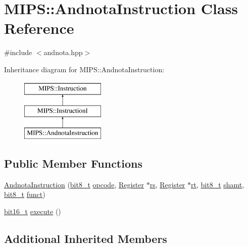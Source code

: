 \hypertarget{classMIPS_1_1AndnotaInstruction}{}\section{M\+I\+PS\+:\+:Andnota\+Instruction Class Reference}
\label{classMIPS_1_1AndnotaInstruction}


{\ttfamily \#include $<$andnota.\+hpp$>$}

Inheritance diagram for M\+I\+PS\+:\+:Andnota\+Instruction\+:\begin{figure}[H]
\begin{center}
\leavevmode
\includegraphics[height=3.000000cm]{classMIPS_1_1AndnotaInstruction}
\end{center}
\end{figure}
\subsection*{Public Member Functions}
\begin{DoxyCompactItemize}
\item 
\hyperlink{classMIPS_1_1AndnotaInstruction_aaa02f585a018e3194fc4b3fc0b2f4b04}{Andnota\+Instruction} (\hyperlink{core_8hpp_a6074bae122ae7b527864eec42c728c3c}{bit8\+\_\+t} \hyperlink{classMIPS_1_1Instruction_a45cc6808b5dde8a5d41067d148b55476}{opcode}, \hyperlink{classMIPS_1_1Register}{Register} $\ast$\hyperlink{classMIPS_1_1InstructionI_a2be191d5b3dce505e2e626ec02eb4d62}{rs}, \hyperlink{classMIPS_1_1Register}{Register} $\ast$\hyperlink{classMIPS_1_1InstructionI_add1db07a5c954f35271de8c8a5737487}{rt}, \hyperlink{core_8hpp_a6074bae122ae7b527864eec42c728c3c}{bit8\+\_\+t} \hyperlink{classMIPS_1_1InstructionI_aa9b6da37c374c2ec8d96448d341e5e7d}{shamt}, \hyperlink{core_8hpp_a6074bae122ae7b527864eec42c728c3c}{bit8\+\_\+t} \hyperlink{classMIPS_1_1InstructionI_a5c6efcbbd233a7447c1fe24ea0a1e558}{funct})
\item 
\hyperlink{core_8hpp_adc265a970bc35995b5879784bbb3f1b7}{bit16\+\_\+t} \hyperlink{classMIPS_1_1AndnotaInstruction_afdc3b2836318f4adaa32dfa3bcdf7c45}{execute} ()
\end{DoxyCompactItemize}
\subsection*{Additional Inherited Members}


